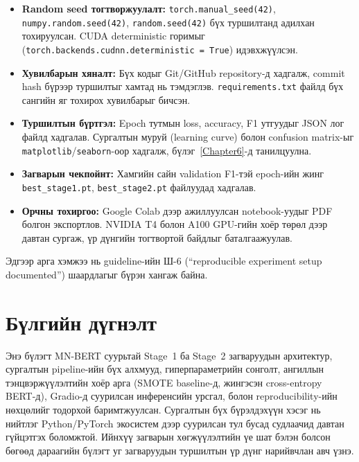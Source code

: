 \begin{itemize}
  \item \textbf{Random seed тогтворжуулалт:} \texttt{torch.manual\_seed(42)},
    \texttt{numpy.random.seed(42)}, \texttt{random.seed(42)} бүх туршилтанд
    адилхан тохируулсан. CUDA deterministic горимыг
    (\texttt{torch.backends.cudnn.deterministic = True}) идэвхжүүлсэн.
  \item \textbf{Хувилбарын хяналт:} Бүх кодыг Git/GitHub repository-д хадгалж,
    commit hash бүрээр туршилтыг хамтад нь тэмдэглэв. \texttt{requirements.txt}
    файлд бүх сангийн яг тохирох хувилбарыг бичсэн.
  \item \textbf{Туршилтын бүртгэл:} Epoch тутмын loss, accuracy, F1 утгуудыг
    JSON лог файлд хадгалав. Сургалтын муруй (learning curve) болон
    confusion matrix-ыг \texttt{matplotlib}/\texttt{seaborn}-оор хадгалж,
    бүлэг~\ref{Chapter6}-д танилцуулна.
  \item \textbf{Загварын чекпойнт:} Хамгийн сайн validation F1-тэй epoch-ийн
    жинг \texttt{best\_stage1.pt}, \texttt{best\_stage2.pt} файлуудад хадгалав.
  \item \textbf{Орчны тохиргоо:} Google Colab дээр ажиллуулсан notebook-уудыг
    PDF болгон экспортлов. NVIDIA T4 болон A100 GPU-гийн хоёр төрөл дээр
    давтан сургаж, үр дүнгийн тогтвортой байдлыг баталгаажуулав.
\end{itemize}

Эдгээр арга хэмжээ нь guideline-ийн Ш-6 (``reproducible experiment setup
documented'') шаардлагыг бүрэн хангаж байна.

\section{Бүлгийн дүгнэлт}

Энэ бүлэгт MN-BERT суурьтай Stage~1 ба Stage~2 загваруудын архитектур, сургалтын
pipeline-ийн бүх алхмууд, гиперпараметрийн сонголт, ангиллын тэнцвэржүүлэлтийн
хоёр арга (SMOTE baseline-д, жингэсэн cross-entropy BERT-д), Gradio-д
суурилсан инференсийн урсгал, болон reproducibility-ийн нөхцөлийг тодорхой
баримтжуулсан. Сургалтын бүх бүрэлдэхүүн хэсэг нь нийтлэг Python/PyTorch
экосистем дээр суурилсан тул бусад судлаачид давтан гүйцэтгэх боломжтой. Ийнхүү
загварын хөгжүүлэлтийн үе шат бэлэн болсон бөгөөд дараагийн бүлэгт уг
загваруудын туршилтын үр дүнг нарийвчлан авч үзнэ.
